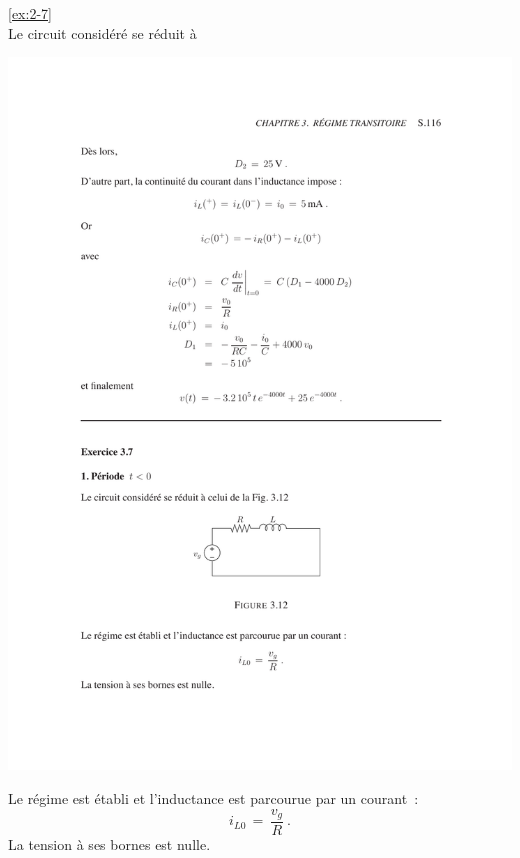 \begin{solexercise}{\ref{ex:2-7}}
	\label{solex:2-7}
\\
Le circuit consid\'er\'e se r\'eduit \`a
\begin{center}
	\includegraphics[width=\linewidth]{sol_exercices/ex3-7-1}
\end{center}
Le r\'egime est \'etabli et l'inductance est parcourue par un courant~:
\[ i_{L0} \, = \, \dfrac{v_g}{R}~. \]
La tension \`a ses bornes est nulle.


\end{solexercise}
